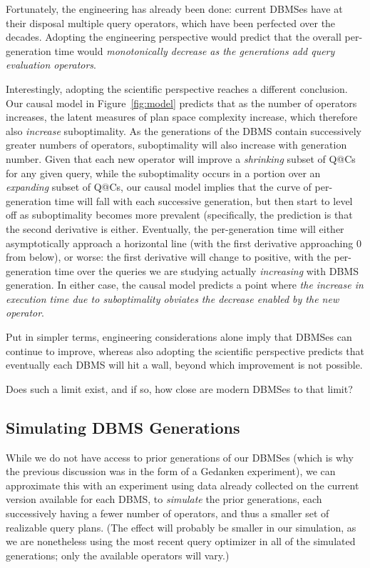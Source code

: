 \documentclass[prodmode,acmtods]{acmsmall}
\begin{document}
Fortunately, the engineering has already been done: current DBMSes have at
their disposal multiple query operators, which have been perfected over the
decades. Adopting the engineering perspective would predict that the overall per-generation
time would {\em monotonically decrease as the generations add query evaluation
operators}.

Interestingly, adopting the scientific perspective reaches a different conclusion. Our
causal model in Figure~\ref{fig:model} predicts that as the number of
operators increases, the latent measures of plan space complexity increase,
which therefore also {\em increase} suboptimality. As the generations of the
\hbox{DBMS} contain successively greater numbers of operators, suboptimality
will also increase with generation number.  Given that each new operator
will improve a {\em shrinking}
subset of Q@Cs for any given query, while the suboptimality occurs in a portion over an
{\em expanding} subset of Q@Cs, our causal model implies that the curve of
per-generation time will fall with each successive generation, but then
start to level off as suboptimality becomes more prevalent (specifically,
the prediction is that the second derivative is either. Eventually, the
per-generation time will either asymptotically approach a horizontal line
(with the first derivative approaching 0 from below), or worse: the first
derivative will change to positive, with the per-generation time over the
queries we are studying actually {\em increasing} with \hbox{DBMS}
generation. In either case, the causal model predicts a point where {\em the
\hbox{increase} in execution time due to suboptimality obviates the decrease
enabled by the new operator}.

Put in simpler terms, engineering considerations alone imply that DBMSes can
continue to improve, whereas also adopting the scientific perspective predicts
that eventually each DBMS will hit a wall, beyond which improvement is not possible.

Does such a limit exist, and if so, how close are modern \hbox{DBMSes} to that limit?

\subsection{Simulating \hbox{DBMS} Generations}
While we do not have access to prior generations of our \hbox{DBMSes} (which is why
the previous discussion was in the form of a Gedanken experiment), we can
approximate this with an experiment using data already collected on the
current version available for each \hbox{DBMS}, to {\em simulate} the prior
generations, each successively having a fewer number of operators, and thus a smaller set of
realizable query plans. (The effect will probably be smaller in our
simulation, as we are nonetheless using the most recent query
optimizer in all of the simulated generations; only the available operators
will vary.)
\end{document}
